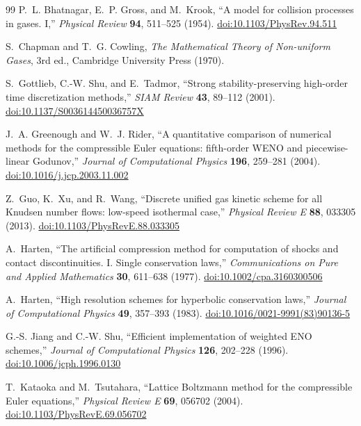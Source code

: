 \documentclass[11pt]{article}
\begin{document}
\begin{thebibliography}{99}
\small
{}
P.~L. Bhatnagar, E.~P. Gross, and M.~Krook, ``A model for collision processes in gases. I,''
\emph{Physical Review} \textbf{94}, 511--525 (1954).
\href{https://doi.org/10.1103/PhysRev.94.511}{doi:10.1103/PhysRev.94.511}

S.~Chapman and T.~G. Cowling, \emph{The Mathematical Theory of Non-uniform Gases}, 3rd ed.,
Cambridge University Press (1970).

S.~Gottlieb, C.-W. Shu, and E.~Tadmor, ``Strong stability-preserving high-order time
discretization methods,'' \emph{SIAM Review} \textbf{43}, 89--112 (2001).
\href{https://doi.org/10.1137/S003614450036757X}{doi:10.1137/S003614450036757X}

J.~A. Greenough and W.~J. Rider, ``A quantitative comparison of numerical methods for the
compressible Euler equations: fifth-order WENO and piecewise-linear Godunov,''
\emph{Journal of Computational Physics} \textbf{196}, 259--281 (2004).
\href{https://doi.org/10.1016/j.jcp.2003.11.002}{doi:10.1016/j.jcp.2003.11.002}

Z.~Guo, K.~Xu, and R.~Wang, ``Discrete unified gas kinetic scheme for all Knudsen number
flows: low-speed isothermal case,'' \emph{Physical Review E} \textbf{88}, 033305 (2013).
\href{https://doi.org/10.1103/PhysRevE.88.033305}{doi:10.1103/PhysRevE.88.033305}

A.~Harten, ``The artificial compression method for computation of shocks and contact
discontinuities. I. Single conservation laws,'' \emph{Communications on Pure and Applied
Mathematics} \textbf{30}, 611--638 (1977).
\href{https://doi.org/10.1002/cpa.3160300506}{doi:10.1002/cpa.3160300506}

A.~Harten, ``High resolution schemes for hyperbolic conservation laws,'' \emph{Journal of
Computational Physics} \textbf{49}, 357--393 (1983).
\href{https://doi.org/10.1016/0021-9991(83)90136-5}{doi:10.1016/0021-9991(83)90136-5}

G.-S. Jiang and C.-W. Shu, ``Efficient implementation of weighted ENO schemes,''
\emph{Journal of Computational Physics} \textbf{126}, 202--228 (1996).
\href{https://doi.org/10.1006/jcph.1996.0130}{doi:10.1006/jcph.1996.0130}

T.~Kataoka and M.~Tsutahara, ``Lattice Boltzmann method for the compressible Euler
equations,'' \emph{Physical Review E} \textbf{69}, 056702 (2004).
\href{https://doi.org/10.1103/PhysRevE.69.056702}{doi:10.1103/PhysRevE.69.056702}


\end{thebibliography}
\end{document}
